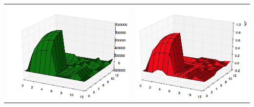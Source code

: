 \documentclass[mathserif]{beamer}
\begin{document}
\begin{frame}
\begin{tabular}{cc}
	\includegraphics[scale=0.14]{generated_real.png} &
	\includegraphics[scale=0.14]{generated_sk.png} \\
	\end{tabular}
	
	\end{frame}
\end{document}

